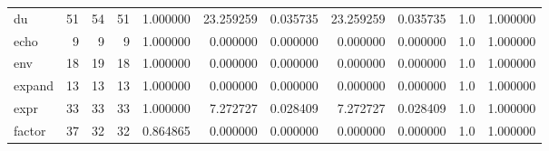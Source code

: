 \begin{tabular}{lrrrrrrrrrr}
du        &                                      51 &                 54 &                                51 &                                   1.000000 &                              23.259259 &                                     0.035735 &                         23.259259 &                                0.035735 &                                1.0 &                                           1.000000 \\
echo      &                                       9 &                  9 &                                 9 &                                   1.000000 &                               0.000000 &                                     0.000000 &                          0.000000 &                                0.000000 &                                1.0 &                                           1.000000 \\
env       &                                      18 &                 19 &                                18 &                                   1.000000 &                               0.000000 &                                     0.000000 &                          0.000000 &                                0.000000 &                                1.0 &                                           1.000000 \\
expand    &                                      13 &                 13 &                                13 &                                   1.000000 &                               0.000000 &                                     0.000000 &                          0.000000 &                                0.000000 &                                1.0 &                                           1.000000 \\
expr      &                                      33 &                 33 &                                33 &                                   1.000000 &                               7.272727 &                                     0.028409 &                          7.272727 &                                0.028409 &                                1.0 &                                           1.000000 \\
factor    &                                      37 &                 32 &                                32 &                                   0.864865 &                               0.000000 &                                     0.000000 &                          0.000000 &                                0.000000 &                                1.0 &                                           1.000000 \\

\end{tabular}
